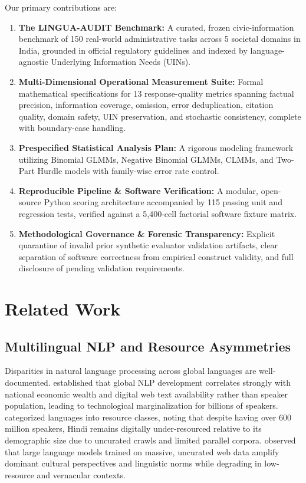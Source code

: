 \documentclass[11pt,a4paper]{article}
\begin{document}
Our primary contributions are:
\begin{enumerate}
  \item \textbf{The LINGUA-AUDIT Benchmark:} A curated, frozen civic-information benchmark of 150 real-world administrative tasks across 5 societal domains in India, grounded in official regulatory guidelines and indexed by language-agnostic Underlying Information Needs (UINs).
  \item \textbf{Multi-Dimensional Operational Measurement Suite:} Formal mathematical specifications for 13 response-quality metrics spanning factual precision, information coverage, omission, error deduplication, citation quality, domain safety, UIN preservation, and stochastic consistency, complete with boundary-case handling.
  \item \textbf{Prespecified Statistical Analysis Plan:} A rigorous modeling framework utilizing Binomial GLMMs, Negative Binomial GLMMs, CLMMs, and Two-Part Hurdle models with family-wise error rate control.
  \item \textbf{Reproducible Pipeline \& Software Verification:} A modular, open-source Python scoring architecture accompanied by 115 passing unit and regression tests, verified against a 5,400-cell factorial software fixture matrix.
  \item \textbf{Methodological Governance \& Forensic Transparency:} Explicit quarantine of invalid prior synthetic evaluator validation artifacts, clear separation of software correctness from empirical construct validity, and full disclosure of pending validation requirements.
\end{enumerate}

\section{Related Work}
\label{sec:related}

\subsection{Multilingual NLP and Resource Asymmetries}
\label{sec:related_asymmetries}

Disparities in natural language processing across global languages are well-documented. \citet{blasi2022systematic} established that global NLP development correlates strongly with national economic wealth and digital web text availability rather than speaker population, leading to technological marginalization for billions of speakers. \citet{joshi2020state} categorized languages into resource classes, noting that despite having over 600 million speakers, Hindi remains digitally under-resourced relative to its demographic size due to uncurated crawls and limited parallel corpora. \citet{bender2021dangers} observed that large language models trained on massive, uncurated web data amplify dominant cultural perspectives and linguistic norms while degrading in low-resource and vernacular contexts.
\end{document}
